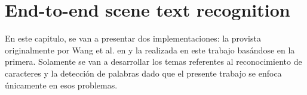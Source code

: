 \newpage	
\section{End-to-end scene text recognition}

	En este capitulo, se van a presentar dos implementaciones: la provista originalmente por Wang et al. en \cite{wang} y la realizada en este trabajo basándose en la primera. Solamente se van a desarrollar los temas referentes al reconocimiento de caracteres y la detección de palabras dado que el presente trabajo se enfoca únicamente en esos problemas.
	
	
	
	
